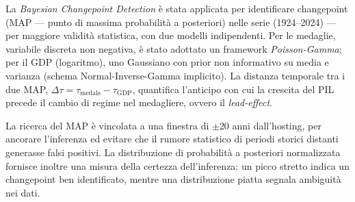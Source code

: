 

La \textit{Bayesian Changepoint Detection} è stata applicata per identificare
changepoint (MAP --- punto di massima probabilità a posteriori) nelle serie
(1924--2024) --- per maggiore validità statistica, con due modelli
indipendenti. Per le medaglie, variabile discreta non negativa, è stato adottato
un framework \textit{Poisson-Gamma}; per il GDP (logaritmo), uno Gaussiano con
prior non informativo su media e varianza (schema Normal-Inverse-Gamma
implicito). La distanza temporale tra i due MAP, $\Delta\tau =
\tau_{\text{medals}} - \tau_{\text{GDP}}$, quantifica l'anticipo con cui la
crescita del PIL precede il cambio di regime nel medagliere, ovvero il
\textit{lead-effect}.


La ricerca del MAP è vincolata a una finestra di $\pm$20 anni dall'hosting, per
ancorare l'inferenza ed evitare che il rumore statistico di periodi storici
distanti generasse falsi positivi. La distribuzione di probabilità a posteriori
normalizzata fornisce inoltre una misura della certezza dell'inferenza: un picco
stretto indica un changepoint ben identificato, mentre una distribuzione piatta
segnala ambiguità nei dati.